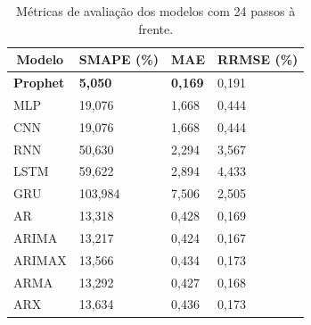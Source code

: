 \begin{table}[!htb]
	\centering
	\caption{Métricas de avaliação dos modelos com 24 passos à frente.}
	\label{tab:metrics}


	
	\begin{tabular}{llll}
		\toprule
		\multicolumn{1}{c}{\textbf{Modelo}} & \multicolumn{1}{c}{\textbf{SMAPE} (\%)} & \multicolumn{1}{c}{\textbf{MAE}} & \multicolumn{1}{c}{\textbf{RRMSE} (\%)} \\ \midrule
		\textbf{Prophet }                            & \textbf{5,050}                              & \textbf{0,169 }                           & 0,191                              \\
		MLP                                 & 19,076                             & 1,668                            & 0,444                              \\
		CNN                                 & 19,076                             & 1,668                            & 0,444                              \\
		RNN                                 & 50,630                             & 2,294                            & 3,567                              \\
		LSTM                                & 59,622                             & 2,894                            & 4,433                              \\
		GRU                                 & 103,984                            & 7,506                            & 2,505                              \\
		AR                                  & 13,318                             & 0,428                            & 0,169                              \\
		ARIMA                               & 13,217                             & 0,424                            & 0,167                              \\
		ARIMAX                              & 13,566                             & 0,434                            & 0,173                              \\
		ARMA                                & 13,292                             & 0,427                            & 0,168                              \\
		ARX                                 & 13,634                             & 0,436                            & 0,173                              \\

\end{tabular}
\end{table}
